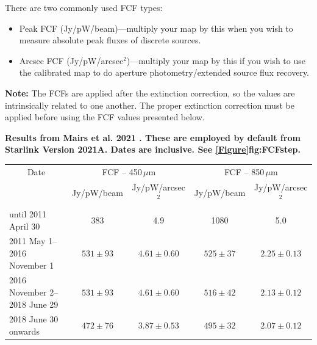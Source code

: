 \vspace{5mm}

There are two commonly used FCF types:
\begin{itemize}
\item Peak FCF (Jy/pW/beam)---multiply your map by this when you wish
to measure absolute peak fluxes of discrete sources.
\item Arcsec FCF (Jy/pW/arcsec$^2$)---multiply your map by this if
you wish to use the calibrated map to do aperture photometry/extended source flux recovery.
\end{itemize}

\textbf{Note:} The FCFs are applied after the extinction correction, so the values are intrinsically
related to one another. The proper extinction correction must be applied before using the FCF
values presented below.

\newpage

\textbf{Results from Mairs et al. 2021 \cite{mairs21}.  These are employed %
by default from Starlink Version 2021A. Dates are inclusive. See
\cref{Figure}{fig:FCFstep}{}.}\\
\begin{table}[h!]
\begin{center}
\begin{tabular}{|l|c|c|c|c|}
 \hline
 \multicolumn{1}{|c|}{Date} &
 \multicolumn{2}{c|}{FCF -- 450\,$\mu$m} &
 \multicolumn{2}{c|}{FCF -- 850\,$\mu$m} \\
\cline{2-5}
& Jy/pW/beam &Jy/pW/arcsec$^2$ & Jy/pW/beam &Jy/pW/arcsec$^2$ \\
 \hline
until 2011 April 30           &  383       &  4.9          & 1080       &  5.0 \\
2011 May 1--2016 November 1   & $531\pm93$ & $4.61\pm0.60$ & $525\pm37$ & $2.25\pm0.13$ \\
2016 November 2--2018 June 29 & $531\pm93$ & $4.61\pm0.60$ & $516\pm42$ & $2.13\pm0.12$ \\
2018 June 30 onwards          & $472\pm76$ & $3.87\pm0.53$ & $495\pm32$ & $2.07\pm0.12$ \\
\hline
\end{tabular}
\end{center}
\end{table}

